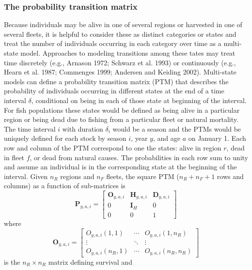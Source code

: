 \documentclass[
]{article}
\begin{document}
\hypertarget{the-probability-transition-matrix}{%
\subsubsection*{The probability transition
matrix}\label{the-probability-transition-matrix}}

Because individuals may be alive in one of several regions or harvested
in one of several fleets, it is helpful to consider these as distinct
categories or states and treat the number of individuals occurring in
each category over time as a multi-state model. Approaches to modeling
transitions among these tates may treat time discretely (e.g., Arnason
1972; Schwarz et al. 1993) or continuously (e.g., Hearn et al. 1987;
Commenges 1999; Andersen and Keiding 2002). Multi-state models can
define a probability transition matrix (PTM) that describes the
probability of individuals occurring in different states at the end of a
time interval \(\delta\), conditional on being in each of those state at
beginning of the interval. For fish populations these states would be
defined as being alive in a particular region or being dead due to
fishing from a particular fleet or natural mortality. The time interval
\(i\) with duration \(\delta_i\) would be a season and the PTMs would be
uniquely defined for each stock by season \(i\), year \(y\), and age
\(a\) on January 1. Each row and column of the PTM correspond to one the
states: alive in region \(r\), dead in fleet \(f\), or dead from natural
causes. The probabilities in each row sum to unity and assume an
individual is in the corresponding state at the beginning of the
interval. Given \(n_R\) regions and \(n_F\) fleets, the square PTM
(\(n_R + n_F + 1\) rows and columns) as a function of sub-matrices is
\begin{equation}\label{eq:ptm}
  \mathbf{P}_{y,a,i} = \begin{bmatrix}
    \mathbf{O}_{y,a,i} & \mathbf{H}_{y,a,i} & \mathbf{D}_{y,a,i} \\
    0 & \mathbf{I}_{H} & 0\\
    0 & 0 & 1
  \end{bmatrix}
\end{equation} where \begin{equation*}
  \mathbf{O}_{y,a,i} = 
  \begin{bmatrix}
    O_{y,a,i}(1,1) & \cdots & O_{y,a,i}(1,n_R) \\
    \vdots & \ddots & \vdots \\
    O_{y,a,i}(n_R,1) & \cdots & O_{y,a,i}(n_R,n_R)
  \end{bmatrix}
\end{equation*} is the \(n_R \times n_R\) matrix defining survival and
\end{document}

